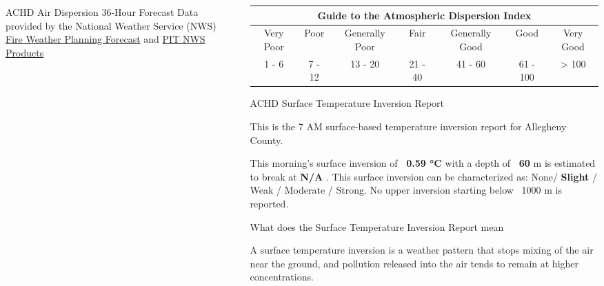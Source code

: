 \documentclass[final]{beamer}
\newlength{\sepwidth}
\newlength{\colwidth}
\newcommand{\separatorcolumn}{\begin{column}{\sepwidth}\end{column}}
\begin{document}
\begin{frame}[t]
\begin{columns}[t]
\begin{column}{\colwidth}
\begin{block}{ACHD Air Dispersion 36-Hour Forecast}
    Data provided by the National Weather Service (NWS)
    \href{https://forecast.weather.gov/product.php?site=NWS&product=FWF&issuedby=PBZ}{Fire Weather Planning Forecast} and \href{http://weather.uwyo.edu/upperair/sounding.html}{PIT NWS Products}

  \end{block}
  
\end{column}

\separatorcolumn

\begin{column}{\colwidth}

    \begin{table}
      \renewcommand{\arraystretch}{1.5}
      \centering
        \begin{tabular}{ |c |c |c |c|c |c |c|  }
        \hline
        \multicolumn{7}{|c|}{Guide to the Atmospheric Dispersion Index} \\
        \hline
        Very Poor & Poor & Generally Poor & Fair & Generally Good & Good & Very Good \\
        \hline
        1 - 6 & 7 - 12 & 13 - 20 & 21 - 40 & 41 - 60 & 61 - 100 & > 100 \\
        \hline
        \end{tabular}
    \end{table}


  \begin{block}{ACHD Surface Temperature Inversion Report}

    This is the 7 AM surface-based temperature inversion report for Allegheny County.

    This morning’s surface inversion of \textbf{~0.59 °C} with a depth of \textbf{~60} m is estimated to break at \textbf{N/A} . This surface inversion can be characterized as: None/ \textbf{Slight} / Weak / Moderate / Strong. No upper inversion starting below ~1000 m is reported.

  \end{block}

  \begin{block}{What does the Surface Temperature Inversion Report mean}

    A surface temperature inversion is a weather pattern that stops mixing of the air near the ground, and pollution released into the air tends to remain at higher concentrations.
    

\end{block}
\end{column}
\end{columns}
\end{frame}
\end{document}
